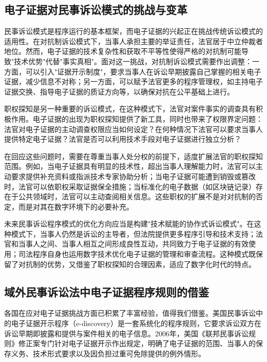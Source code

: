 \subsection{电子证据对民事诉讼模式的挑战与变革}

民事诉讼模式是程序运行的基本框架，而电子证据的兴起正在挑战传统诉讼模式的适用性。在对抗制诉讼模式下，当事人承担主要的举证责任，法官居于中立仲裁者地位。然而，电子证据的技术复杂性和获取不平等性使得严格的对抗制可能导致"技术优势"代替"事实真相"。面对这一挑战，对抗制诉讼模式需要作出调整：一方面，可以引入"证据开示制度"，要求当事人在诉讼早期披露自己掌握的相关电子证据，减少信息不对称；另一方面，可以赋予法官更多的程序管理权，如主持电子证据交换、指导电子证据的质证方向等，以确保对抗在公平基础上进行。

职权探知是另一种重要的诉讼模式，在这种模式下，法官对案件事实的调查具有积极作用。电子证据的出现为职权探知提供了新工具，同时也带来了权限界定问题：法官对电子证据的主动调查权限应当如何设定？在何种情况下法官可以要求当事人提供特定电子证据？法官是否可以利用技术手段对电子证据进行独立分析？

在回应这些问题时，需要在尊重当事人处分权的前提下，适度扩展法官的职权探知范围。例如，当电子证据具有明显的技术性，超出当事人理解能力时，法官可以主动要求提供补充资料或指派技术专家协助分析；当电子证据可能遭到销毁或篡改时，法官可以依职权采取证据保全措施；当标准化的电子数据（如区块链记录）存在于公共领域时，法官可以主动查阅相关信息。这些职权的扩展不是对对抗制的否定，而是对其在数字环境下的必要补充。

未来民事诉讼程序模式的优化方向应当是构建"技术赋能的协作式诉讼模式"。在这种模式下，当事人仍然是诉讼的主导者，但法院提供更多程序引导和技术支持；法官和当事人之间、当事人相互之间形成良性互动，共同致力于电子证据的有效使用；司法程序自身也运用数字技术优化电子证据的管理和审查流程。这种模式既保留了对抗制的优势，又借鉴了职权探知的合理因素，适应了数字化时代的特点。

\subsection{域外民事诉讼法中电子证据程序规则的借鉴}

各国在应对电子证据挑战方面已积累了丰富经验，值得我们借鉴。美国民事诉讼中的电子证据开示程序（e-discovery）是一套系统化的程序规则，它要求诉讼双方在诉讼早期即披露和提供与案件相关的电子信息。2006年，美国《联邦民事诉讼规则》修正案专门针对电子证据开示作出规定，明确了电子证据的范围、当事人的保存义务、技术形式要求以及因负担过重可免除提供的例外情形。

